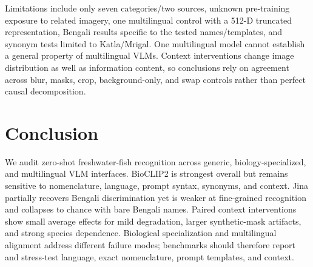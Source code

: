 \documentclass{article}
\begin{document}
Limitations include only seven categories/two sources, unknown pre-training exposure to related imagery, one multilingual control with a 512-D truncated representation, Bengali results specific to the tested names/templates, and synonym tests limited to Katla/Mrigal. One multilingual model cannot establish a general property of multilingual VLMs. Context interventions change image distribution as well as information content, so conclusions rely on agreement across blur, masks, crop, background-only, and swap controls rather than perfect causal decomposition.

\section{Conclusion}
We audit zero-shot freshwater-fish recognition across generic, biology-specialized, and multilingual VLM interfaces. BioCLIP2 is strongest overall but remains sensitive to nomenclature, language, prompt syntax, synonyms, and context. Jina partially recovers Bengali discrimination yet is weaker at fine-grained recognition and collapses to chance with bare Bengali names. Paired context interventions show small average effects for mild degradation, larger synthetic-mask artifacts, and strong species dependence. Biological specialization and multilingual alignment address different failure modes; benchmarks should therefore report and stress-test language, exact nomenclature, prompt templates, and context.



\end{document}
